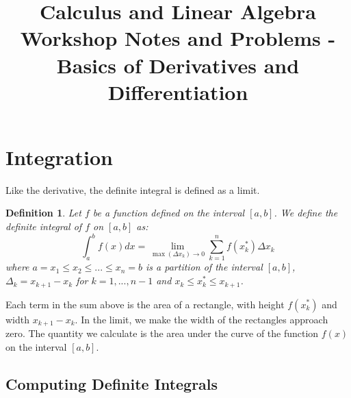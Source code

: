 \documentclass[12pt,a4paper]{article} %
\title{Calculus and Linear Algebra Workshop Notes and Problems - Basics of Derivatives and Differentiation}
\newtheorem{defn}{Definition}
\begin{document}
\maketitle
\section{Integration}
Like the derivative, the definite integral is defined as a limit.
\begin{defn}
Let $f$ be a function defined on the interval $[a,b]$. We define the definite integral of $f$ on $[a,b]$ as:
$$\int_a^bf(x)dx	=	\lim_{\max(\Delta x_k)\rightarrow 0}\sum_{k=1}^nf(x_k^*)\Delta x_k$$
where $a=x_1\leq x_2\leq ... \leq x_n=b$ is a partition of the interval $[a,b]$, $\Delta_k = x_{k+1}-x_k$ for $k=1,...,n-1$ and $x_k\leq x_k^*\leq x_{k+1}$. 
\end{defn}
Each term in the sum above is the area of a rectangle, with height $f(x_k^*)$ and width $x_{k+1}-x_k$. In the limit, we make the width of the rectangles approach zero. The quantity we calculate is the area under the curve of the function $f(x)$ on the interval $[a,b]$.
\subsection{Computing Definite Integrals}
\end{document}
